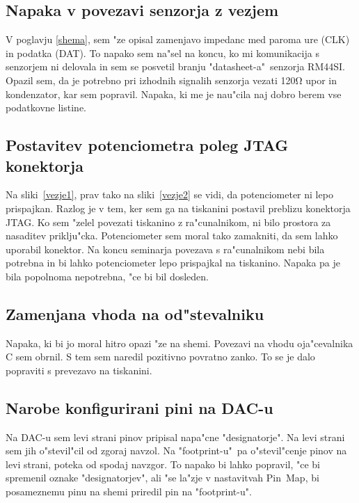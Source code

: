 \documentclass[a4paper]{article}
\begin{document}
\subsection{Napaka v povezavi senzorja z vezjem}

V poglavju \ref{shema}, sem "ze opisal zamenjavo impedanc med paroma ure (CLK) in podatka (DAT). To napako sem na"sel na koncu, ko mi komunikacija s senzorjem ni delovala in sem se posvetil branju "\mbox{datasheet-a}"~senzorja RM44SI. Opazil sem, da je potrebno pri izhodnih signalih senzorja vezati 120$\mathrm{\Omega}$ upor in kondenzator, kar sem popravil. Napaka, ki me je nau"cila naj dobro berem vse podatkovne listine.


\subsection{Postavitev potenciometra poleg JTAG konektorja}

Na sliki~\ref{vezje1}, prav tako na sliki~\ref{vezje2} se vidi, da potenciometer ni lepo prispajkan. Razlog je v tem, ker sem ga na tiskanini postavil preblizu konektorja JTAG. Ko sem "zelel povezati tiskanino z ra"cunalnikom, ni bilo prostora za nasaditev priklju"cka. Potenciometer sem moral tako zamakniti, da sem lahko uporabil konektor. Na koncu seminarja povezava s ra"cunalnikom nebi bila potrebna in bi lahko potenciometer lepo prispajkal na tiskanino. Napaka pa je bila popolnoma nepotrebna, "ce bi bil dosleden.

\subsection{Zamenjana vhoda na od"stevalniku}

Napaka, ki bi jo moral hitro opazi "ze na shemi. Povezavi na vhodu oja"cevalnika C sem obrnil. S tem  sem naredil pozitivno povratno zanko. To se je dalo popraviti s prevezavo na tiskanini. 

\subsection{Narobe konfigurirani pini na DAC-u}

Na DAC-u sem levi strani pinov pripisal napa"cne "designatorje". Na levi strani sem jih o"stevil"cil od zgoraj navzol. Na "footprint-u"~pa o"stevil"cenje pinov na levi strani,  poteka od spodaj navzgor. To napako bi lahko popravil, "ce bi spremenil oznake "designatorjev", ali "se la"zje v nastavitvah Pin~Map, bi posameznemu pinu na shemi priredil pin na "footprint-u".
\end{document}
